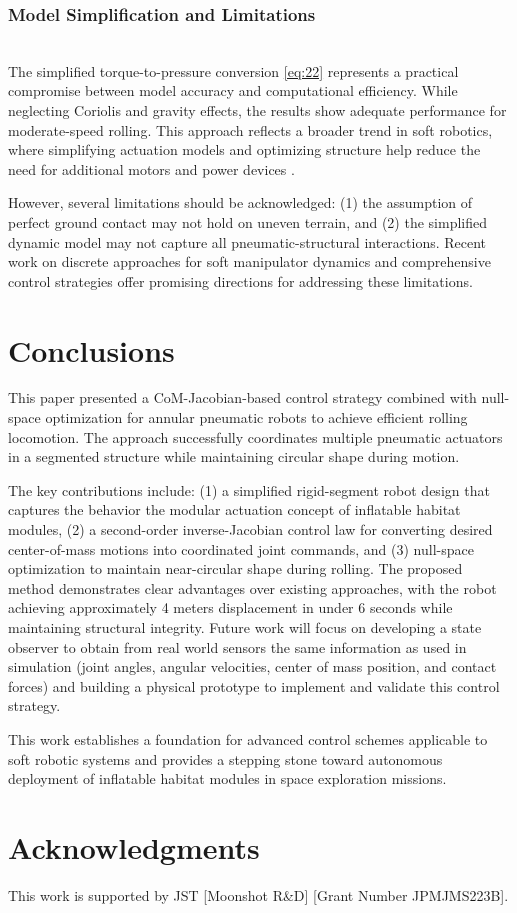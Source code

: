 \documentclass[a4paper, 10pt, conference]{ieeeconf}
\begin{document}
\subsubsection{Model Simplification and Limitations}
\\
The simplified torque-to-pressure conversion \eqref{eq:22} represents a practical compromise between model accuracy and computational efficiency. While neglecting Coriolis and gravity effects, the results show adequate performance for moderate-speed rolling. This approach reflects a broader trend in soft robotics, where simplifying actuation models and optimizing structure help reduce the need for additional motors and power devices \cite{b14}.

However, several limitations should be acknowledged: (1) the assumption of perfect ground contact may not hold on uneven terrain, and (2) the simplified dynamic model may not capture all pneumatic-structural interactions. Recent work on discrete approaches for soft manipulator dynamics \cite{b15} and comprehensive control strategies \cite{b16} offer promising directions for addressing these limitations.


\section{Conclusions}

This paper presented a CoM-Jacobian-based control strategy combined with null-space optimization for annular pneumatic robots to achieve efficient rolling locomotion. The approach successfully coordinates multiple pneumatic actuators in a segmented structure while maintaining circular shape during motion.

The key contributions include: (1) a simplified rigid-segment robot design that captures the behavior the modular actuation concept of inflatable habitat modules, (2) a second-order inverse-Jacobian control law for converting desired center-of-mass motions into coordinated joint commands, and (3) null-space optimization to maintain near-circular shape during rolling.
The proposed method demonstrates clear advantages over existing approaches, with the robot achieving approximately 4 meters displacement in under 6 seconds while maintaining structural integrity. Future work will focus on developing a state observer to obtain from real world sensors the same information as used in simulation (joint angles, angular velocities, center of mass position, and contact forces) and building a physical prototype to implement and validate this control strategy.

This work establishes a foundation for advanced control schemes applicable to soft robotic systems and provides a stepping stone toward autonomous deployment of inflatable habitat modules in space exploration missions.

\section*{Acknowledgments}
This work is supported by JST [Moonshot R\&D] [Grant Number JPMJMS223B].



\end{document}
